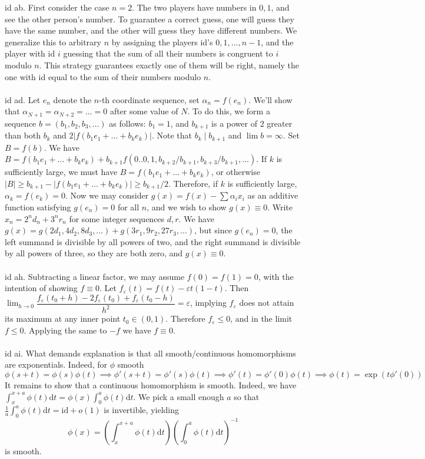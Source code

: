 \documentclass[oneside]{book}
\newcommand{\eps}{\varepsilon}
\newcommand{\fit}[1]{\left( #1\right)}
\newcommand{\inv}{^{-1}}
\newcommand{\abs}[1]{\left\lvert #1\right\rvert}
\renewcommand{\d}{\mathrm{d}}
\newcommand{\dt}{\mathrm{d}t}
\newcommand{\id}{\mathrm{id}}
\begin{document}
id ab. First consider the case $n=2$. The two players have numbers in $0,1$, and see the other person's number. To guarantee a correct guess, one will guess they have the same number, and the other will guess they have different numbers. We generalize this to arbitrary $n$ by assigning the players id's $0,1,\dots,n-1$, and the player with id $i$ guessing that the sum of all their numbers is congruent to $i$ modulo $n$. This strategy guarantees exactly one of them will be right, namely the one with id equal to the sum of their numbers modulo $n$.     \\\\


id ad. Let $e_n$ denote the $n$-th coordinate sequence, set $\alpha_n=f(e_n)$. We'll show that $\alpha_{N+1}=\alpha_{N+2}=\dots = 0$ after some value of $N$. To do this, we form a sequence $b=(b_1,b_2,b_3,\dots)$ as follows: $b_1=1$, and $b_{k+1}$ is a power of $2$ greater than both $b_k$ and $2\abs{f(b_1e_1+\dots+b_ke_k)}$. Note that $b_k\mid b_{k+1}$ and $\lim b=\infty$. Set $B=f(b)$. We have $B=f(b_1e_1+\dots+b_ke_k)+b_{k+1}f\fit{0..0,1,{b_{k+2}}/{b_{k+1}},{b_{k+3}}/{b_{k+1}},\dots}$. If $k$ is sufficiently large, we must have $B=f(b_1e_1+\dots+b_ke_k)$, or otherwise $|B|\ge b_{k+1} - \abs{f(b_1e_1+\dots+b_ke_k)}\ge b_{k+1}/2$. Therefore, if $k$ is sufficiently large, $\alpha_k=f(e_k)=0$. Now we may consider $g(x)=f(x)-\sum \alpha_i x_i$ as an additive function satisfying $g(e_n)=0$ for all $n$, and we wish to show $g(x)\equiv 0$. Write $x_n = 2^n d_n + 3^n r_n$ for some integer sequences $d,r$. We have $g(x)=g(2d_1,4d_2,8d_3,\dots)+g(3r_1,9r_2,27r_3,\dots)$, but since $g(e_n)=0$, the left summand is divisible by all powers of two, and the right summand is divisible by all powers of three, so they are both zero, and $g(x)\equiv0$. \\\\


id ah. Subtracting a linear factor, we may assume $f(0)=f(1)=0$, with the intention of showing $f\equiv 0$. Let $f_\eps(t)=f(t)-\eps t(1-t)$. Then $\displaystyle\lim_{h\to 0}\dfrac{f_\eps(t_0+h)-2f_\eps(t_0)+f_\eps(t_0-h)}{h^2}=\eps$, implying $f_\eps$ does not attain its maximum at any inner point $t_0\in(0,1)$. Therefore $f_\eps\le 0$, and in the limit $f\le 0$. Applying the same to $-f$ we have $f\equiv 0$.   \\\\


id ai. What demands explanation is that all smooth/continuous homomorphisms are exponentials. Indeed, for $\phi$ smooth $$\phi(s+t)=\phi(s)\phi(t)\implies \phi'(s+t)=\phi'(s)\phi(t)\implies \phi'(t)=\phi'(0)\phi(t)\implies\phi(t)=\exp(t\phi'(0))$$
It remains to show that a continuous homomorphism is smooth. Indeed, we have $\int_x^{x+a}\phi(t)\d t=\phi(x)\int_0^a\phi(t)\d t$. We pick a small enough $a$ so that $\frac{1}{a}\int_0^a\phi(t)\d t=\id + o(1)$ is invertible, yielding
$$\phi(x)=\fit{\int_x^{x+a}\phi(t)\dt}\fit{\int_0^a\phi(t)\dt}\inv$$
is smooth.  \\\\
\end{document}

